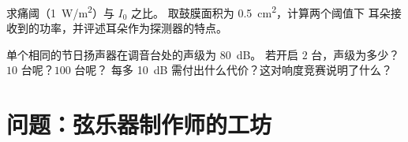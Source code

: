 \begin{exercise}[$\star\star\star$]\label{exo:g12:sound-acoustics:14}
求痛阈（\qty{1}{W/m^2}）与 $I_0$ 之比。
取鼓膜面积为 \qty{0.5}{cm^2}，计算两个阈值下
耳朵接收到的功率，并评述耳朵作为探测器的特点。
\end{exercise}

\begin{exercise}[$\star\star\star$]\label{exo:g12:sound-acoustics:15}
单个相同的节日扬声器在调音台处的声级为 \qty{80}{dB}。
若开启 $2$ 台，声级为多少？$10$ 台呢？$100$ 台呢？
每多 \qty{+10}{dB} 需付出什么代价？这对响度竞赛说明了什么？
\end{exercise}

\section{问题：弦乐器制作师的工坊}

